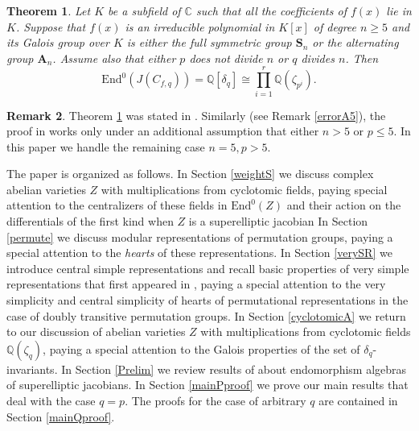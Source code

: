 \documentclass[12pt,a4paper,reqno]{amsart}
\def\Q{{\mathbb Q}}
\def\C{{\mathbb C}}
\def\Sn{{\mathbf S}_n}
\def\An{{\mathbf A}_n}
\def\End{\mathrm{End}}
\newtheorem{thm}{Theorem}[section]
\theoremstyle{definition}
\newtheorem{rem}[thm]{Remark}
\begin{document}
\begin{thm}
\label{endoQ}
Let $K$ be a subfield of $\C$ such that all the coefficients of $f(x)$
lie in $K$. Suppose that $f(x)$ is an irreducible polynomial in $K[x]$
of degree $n \ge 5$
 and its Galois group over $K$ is either the full symmetric group $\Sn$ or
the alternating group $\An$. Assume also that either $p$ does not divide $n$ or $q$ divides $n$.
Then
$$\End^0(J(C_{f,q}))=\Q[\delta_q] \cong \prod_{i=1}^r \Q(\zeta_{p^i}).$$

\end{thm}




\begin{rem}
\label{errorA5bis}
Theorem \ref{endoQ} was stated in \cite[Th. 1.1]{ZarhinM}. 
Similarly (see Remark \ref{errorA5}), 
the proof in \cite{ZarhinM} works only under an additional assumption that either $n>5$ or $p \le 5$. In this paper we handle the remaining case $n=5, p>5$.
\end{rem}



The paper is organized as follows. In Section \ref{weightS} we discuss complex abelian varieties  $Z$ with multiplications from cyclotomic fields, paying special attention 
to   the centralizers of these fields in $\End^0(Z)$ and their action on the differentials of the first kind when $Z$ is a superelliptic jacobian In Section \ref{permute}
we discuss modular representations of permutation groups, paying a special attention to the {\sl hearts} of these representations.
In Section \ref{verySR} we introduce central simple representations and recall basic properties of very simple representations that first appeared in \cite{ZarhinM,ZarhinClifford},
paying a special attention to the very simplicity and central simplicity of hearts of permutational representations in the case of doubly transitive permutation groups.
In Section \ref{cyclotomicA} we return to our discussion of abelian varieties  $Z$ with multiplications from cyclotomic fields $\Q(\zeta_q)$, paying a special attention
to the Galois properties of the set of $\delta_q$-invariants. In Section \ref{Prelim} we review results of \cite{ZarhinCambridge} about endomorphism algebras
of superelliptic jacobians. In Section \ref{mainPproof} we prove our main results that deal with the case $q=p$. The proofs for the case of arbitrary $q$ are contained in 
Section \ref{mainQproof}.
\end{document}
